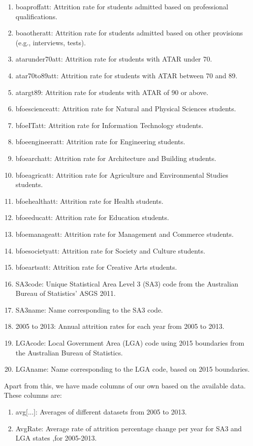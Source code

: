 \documentclass[conference]{IEEEtran}
\begin{document}
\begin{enumerate} [leftmargin=2em, itemsep=0.01em, topsep=0.01em]
    \item boaproffatt: Attrition rate for students admitted based on professional qualifications.
    \item boaotheratt: Attrition rate for students admitted based on other provisions (e.g., interviews, tests).
    \item atarunder70att: Attrition rate for students with ATAR under 70.
    \item atar70to89att: Attrition rate for students with ATAR between 70 and 89.
    \item atargt89: Attrition rate for students with ATAR of 90 or above.
    \item bfoescienceatt: Attrition rate for Natural and Physical Sciences students.
    \item bfoeITatt: Attrition rate for Information Technology students.
    \item bfoeengineeratt: Attrition rate for Engineering students.
    \item bfoearchatt: Attrition rate for Architecture and Building students.
    \item bfoeagricatt: Attrition rate for Agriculture and Environmental Studies students.
    \item bfoehealthatt: Attrition rate for Health students.
    \item bfoeeducatt: Attrition rate for Education students.
    \item bfoemanageatt: Attrition rate for Management and Commerce students.
    \item bfoesocietyatt: Attrition rate for Society and Culture students.
    \item bfoeartsatt: Attrition rate for Creative Arts students.
    \item SA3code: Unique Statistical Area Level 3 (SA3) code from the Australian Bureau of Statistics' ASGS 2011.
    \item SA3name: Name corresponding to the SA3 code.
    \item 2005 to 2013: Annual attrition rates for each year from 2005 to 2013.
    \item LGAcode: Local Government Area (LGA) code using 2015 boundaries from the Australian Bureau of Statistics.
    \item LGAname: Name corresponding to the LGA code, based on 2015 boundaries.
\end{enumerate}
Apart from this, we have made columns of our own based
on the available data. These columns are:
\begin{enumerate} [leftmargin=2em, itemsep=0.05em, topsep=0.05em]
    \item avg[...]: Averages of different datasets from 2005 to 2013.
    \item AvgRate: Average rate of attrition percentage change per year for SA3 and LGA states ,for 2005-2013. 
    
\end{enumerate}
\end{document}
